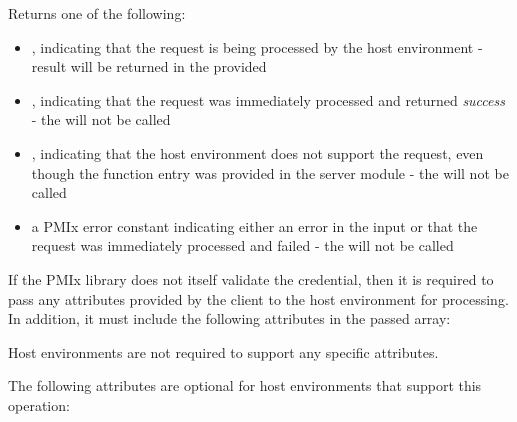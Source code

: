 \begin{arglist}
\end{arglist}

Returns one of the following:

\begin{itemize}
    \item {}, indicating that the request is being processed by the host environment - result will be returned in the provided 
    \item {}, indicating that the request was immediately processed and returned \textit{success} - the  will not be called
    \item {}, indicating that the host environment does not support the request, even though the function entry was provided in the server module - the  will not be called
    \item a PMIx error constant indicating either an error in the input or that the request was immediately processed and failed - the  will not be called
\end{itemize}

\reqattrstart
If the \ac{PMIx} library does not itself validate the credential, then it is required to pass any attributes provided by the client to the host environment for processing. In addition, it must include the following attributes in the passed  array:


\divider

Host environments are not required to support any specific attributes.

\reqattrend

\optattrstart
The following attributes are optional for host environments that support this operation:



